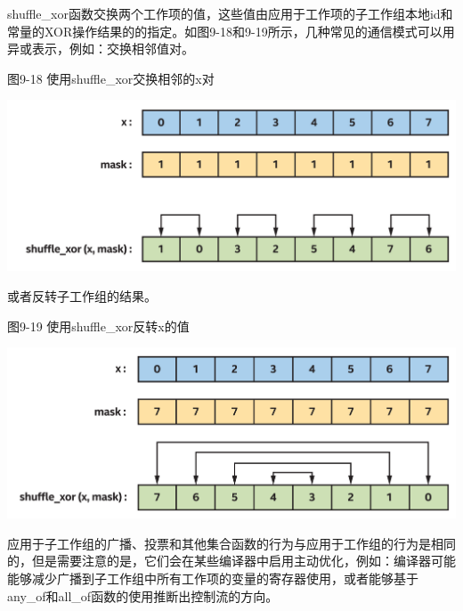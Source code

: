 shuffle\_xor函数交换两个工作项的值，这些值由应用于工作项的子工作组本地id和常量的XOR操作结果的的指定。如图9-18和9-19所示，几种常见的通信模式可以用异或表示，例如：交换相邻值对。\par

\hspace*{\fill} \par %
图9-18 使用shuffle\_xor交换相邻的x对
\begin{center}
	\includegraphics[width=1.\textwidth]{content/chapter-9/images/11}
\end{center}

或者反转子工作组的结果。\par

\hspace*{\fill} \par %
图9-19 使用shuffle\_xor反转x的值
\begin{center}
	\includegraphics[width=1.\textwidth]{content/chapter-9/images/12}
\end{center}

\begin{tcolorbox}[colback=blue!5!white,colframe=blue!75!black, title=使用优化的广播，投票和集合函数]
应用于子工作组的广播、投票和其他集合函数的行为与应用于工作组的行为是相同的，但是需要注意的是，它们会在某些编译器中启用主动优化，例如：编译器可能能够减少广播到子工作组中所有工作项的变量的寄存器使用，或者能够基于any\_of和all\_of函数的使用推断出控制流的方向。
\end{tcolorbox}

